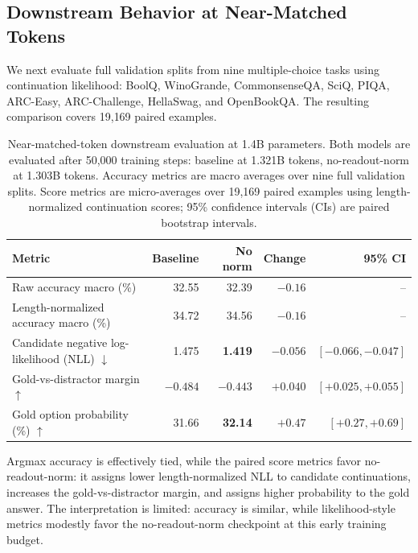 \subsection{Downstream Behavior at Near-Matched Tokens}
\label{sec:scale14b}

We next evaluate full validation splits from nine multiple-choice tasks using continuation likelihood: BoolQ, WinoGrande, CommonsenseQA, SciQ, PIQA, ARC-Easy, ARC-Challenge, HellaSwag, and OpenBookQA.
The resulting comparison covers 19{,}169 paired examples.

\begin{table}[h]
\centering
\small
\caption{Near-matched-token downstream evaluation at 1.4B parameters. Both models are evaluated after 50{,}000 training steps: baseline at 1.321B tokens, no-readout-norm at 1.303B tokens. Accuracy metrics are macro averages over nine full validation splits. Score metrics are micro-averages over 19{,}169 paired examples using length-normalized continuation scores; 95\% confidence intervals (CIs) are paired bootstrap intervals.}
\label{tab:scale14b}
\begin{tabular}{lrrrr}
\toprule
\textbf{Metric} & \textbf{Baseline} & \textbf{No norm} & \textbf{Change} & \textbf{95\% CI} \\
\midrule
Raw accuracy macro (\%) & 32.55 & 32.39 & $-0.16$ & -- \\
Length-normalized accuracy macro (\%) & 34.72 & 34.56 & $-0.16$ & -- \\
Candidate negative log-likelihood (NLL) $\downarrow$ & 1.475 & \textbf{1.419} & {\boldmath$-0.056$} & $[-0.066,-0.047]$ \\
Gold-vs-distractor margin $\uparrow$ & $-0.484$ & {\boldmath$-0.443$} & {\boldmath$+0.040$} & $[+0.025,+0.055]$ \\
Gold option probability (\%) $\uparrow$ & 31.66 & \textbf{32.14} & {\boldmath$+0.47$} & $[+0.27,+0.69]$ \\
\bottomrule
\end{tabular}
\end{table}

Argmax accuracy is effectively tied, while the paired score metrics favor no-readout-norm: it assigns lower length-normalized NLL to candidate continuations, increases the gold-vs-distractor margin, and assigns higher probability to the gold answer.
The interpretation is limited: accuracy is similar, while likelihood-style metrics modestly favor the no-readout-norm checkpoint at this early training budget.

